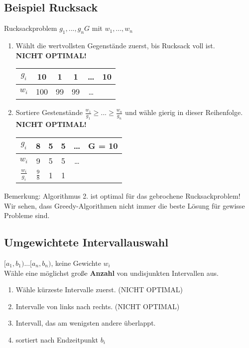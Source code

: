 \subsection{Beispiel Rucksack}
Rucksackproblem $g_1,...,g_n G$ mit $w_1, ..., w_n$ \\
\begin{enumerate}
\item Wählt die wertvollsten Gegenstände zuerst, bis Rucksack voll ist.\\
\textbf{NICHT OPTIMAL!}
\begin{tabular}{|c|c|c|c|c|c|}
$g_i$ & 10 & 1 & 1 & \dots & 10\\
\hline
$w_i$ & 100 & 99 & 99 & \dots & \\
\end{tabular}
\item Sortiere Gestenstände $\frac{w_1}{g_1}\geq ... \geq \frac{w_n}{g_n}$ und wähle gierig in dieser Reihenfolge.
\textbf{NICHT OPTIMAL!}
\begin{tabular}{|c|c|c|c|c|c|}
$g_i$ & 8 &	5& 5 & \dots & G = 10\\
\hline
$w_i$ & 9 & 5 & 5 & \dots & \\
\hline
$\frac{w_i}{g_i}$ & $\frac{9}{8}$ & 1 & 1 & \\
\end{tabular}
\end{enumerate}
Bemerkung: Algorithmus 2. ist optimal für das gebrochene Rucksackproblem!\\
Wir sehen, dass Greedy-Algorithmen nicht immer die beste Lösung für gewisse Probleme sind.
\subsection{Umgewichtete Intervallauswahl}
$[a_1,b_1)...[a_n,b_n)$, keine Gewichte $w_i$\\
Wähle eine möglichst große \textbf{Anzahl} von undisjunkten Intervallen aus.\\
\begin{enumerate}
\item Wähle kürzeste Intervalle zuerst. (NICHT OPTIMAL)
\item Intervalle von links nach rechts. (NICHT OPTIMAL)
\item Intervall, das am wenigsten andere überlappt.
\item sortiert nach Endzeitpunkt $b_i$
\end{enumerate}